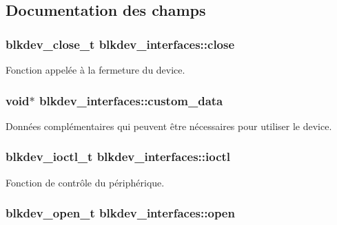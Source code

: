 \subsection{Documentation des champs}
\hypertarget{structblkdev__interfaces_ab7623005e31211894853b3524e1e74eb}{
\subsubsection[{close}]{\setlength{\rightskip}{0pt plus 5cm}blkdev\-\_\-close\-\_\-t blkdev\-\_\-interfaces\-::close}}\label{structblkdev__interfaces_ab7623005e31211894853b3524e1e74eb}
Fonction appelée à la fermeture du device. \hypertarget{structblkdev__interfaces_a8eea79e70042c41cc171796b501a9fd1}{
\subsubsection[{custom\-\_\-data}]{\setlength{\rightskip}{0pt plus 5cm}void$\ast$ blkdev\-\_\-interfaces\-::custom\-\_\-data}}\label{structblkdev__interfaces_a8eea79e70042c41cc171796b501a9fd1}
Données complémentaires qui peuvent être nécessaires pour utiliser le device. \hypertarget{structblkdev__interfaces_ae93720624e6f1a1ea33e31bf1da4c097}{
\subsubsection[{ioctl}]{\setlength{\rightskip}{0pt plus 5cm}blkdev\-\_\-ioctl\-\_\-t blkdev\-\_\-interfaces\-::ioctl}}\label{structblkdev__interfaces_ae93720624e6f1a1ea33e31bf1da4c097}
Fonction de contrôle du périphérique. \hypertarget{structblkdev__interfaces_a08eaa39b105826d2780991b32577867a}{
\subsubsection[{open}]{\setlength{\rightskip}{0pt plus 5cm}blkdev\-\_\-open\-\_\-t blkdev\-\_\-interfaces\-::open}}\label{structblkdev__interfaces_a08eaa39b105826d2780991b32577867a}
